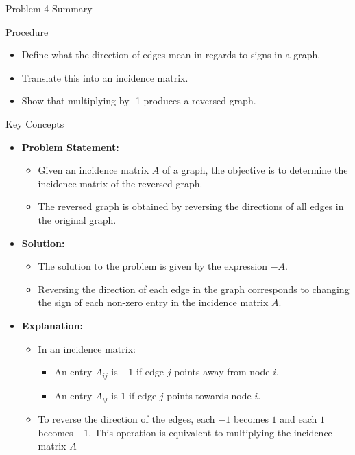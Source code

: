 \begin{summary}{Problem 4 Summary}
    \begin{statement}{Procedure}
        \begin{itemize}
            \item Define what the direction of edges mean in regards to signs in a graph.
            \item Translate this into an incidence matrix.
            \item Show that multiplying by -1 produces a reversed graph.
        \end{itemize}
    \end{statement}
    \begin{statement}{Key Concepts}
        \begin{itemize}
            \item \textbf{Problem Statement:}
            \begin{itemize}
                \item Given an incidence matrix $A$ of a graph, the objective is to determine the incidence matrix of the reversed graph.
                \item The reversed graph is obtained by reversing the directions of all edges in the original graph.
            \end{itemize}
            \item \textbf{Solution:}
            \begin{itemize}
                \item The solution to the problem is given by the expression $-A$.
                \item Reversing the direction of each edge in the graph corresponds to changing the sign of each non-zero entry in the incidence matrix $A$.
            \end{itemize}
            \item \textbf{Explanation:}
            \begin{itemize}
                \item In an incidence matrix:
                \begin{itemize}
                    \item An entry $A_{ij}$ is $-1$ if edge $j$ points away from node $i$.
                    \item An entry $A_{ij}$ is $1$ if edge $j$ points towards node $i$.
                \end{itemize}
                \item To reverse the direction of the edges, each $-1$ becomes $1$ and each $1$ becomes $-1$. This operation is equivalent to multiplying the incidence matrix $A$ 

\end{itemize}
\end{itemize}
\end{statement}
\end{summary}

